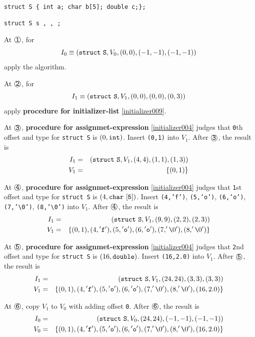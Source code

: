 \begin{Example}

\

{\tt struct S \{ int a; char b[5]; double c;\};}

{\tt struct S s  
,
,
;
}

\noindent
At $\MARU{\tt 1}$, for
\[
I_0 \equiv ({\tt{struct\,\,S}},V_0,(0,0),(-1,-1),(-1,-1)) 
\]
apply the algorithm.

\noindent
At $\MARU{\tt 2}$, for
\[
I_1 \equiv ({\tt{struct\,\,S}},V_1,(0,0),(0,0),(0,3))
\]
apply {\bf procedure for initializer-list} \ref{initializer009}.

\noindent
At $\MARU{\tt 3}$,
{\bf procedure for assignmet-expression} \ref{initializer004} judges
that 
{\tt{0}}th offset and type for {\tt{struct S}} is $(0,{\tt{int}})$.
Insert {\tt (0,1)} into $V_1$. After $\MARU{\tt 3}$, the result is
\begin{eqnarray*}
I_1 & = & ({\tt{struct\,\,S}},V_1,(4,4),(1,1),(1,3)) \\
V_1 & = & \{(0,1)\}
\end{eqnarray*}

\noindent
At $\MARU{\tt 4}$,
{\bf procedure for assignmet-expression} \ref{initializer004} judges
that
{\tt{1}}st offset and type for {\tt{struct S}} is $(4,{\tt{char\,\,[5]}})$.
Insert {\tt{(4,'f')}},
{\tt{(5,'o')}},
{\tt{(6,'o')}},
{\tt{(7,'\verb|\|0')}},
{\tt{(8,'\verb|\|0')}}
into $V_1$.
After $\MARU{\tt 4}$, the result is
\begin{eqnarray*}
I_1 & = & ({\tt{struct\,\,S}},V_1,(9,9),(2,2),(2,3)) \\
V_1 & = & \{(0,1),
 (4,{\tt{'f'}}),(5,{\tt{'o'}}),(6,{\tt{'o'}}),(7,'\verb|\|0'),(8,'\verb|\|0')\}
\end{eqnarray*}

\noindent
At $\MARU{\tt 5}$,
{\bf procedure for assignmet-expression} \ref{initializer004} judges
that
{\tt{2}}nd offset and type for {\tt{struct S}} is $(16,{\tt{double}})$.
Insert {\tt (16,2.0)} into $V_1$.
After $\MARU{\tt 5}$, the result is
\begin{eqnarray*}
I_1 & = & ({\tt{struct\,\,S}},V_1,(24,24),(3,3),(3,3)) \\
V_1 & = & \{(0,1),
 (4,{\tt{'f'}}),(5,{\tt{'o'}}),(6,{\tt{'o'}}),(7,'\verb|\|0'),(8,'\verb|\|0'),
(16,2.0)\}
\end{eqnarray*}

\noindent
At $\MARU{\tt 6}$, copy $V_1$ to $V_0$ with adding offset {\tt 0}.
After $\MARU{\tt 6}$, the result is
\begin{eqnarray*}
I_0 & = & ({\tt{struct\,\,S}},V_0,(24,24),(-1,-1),(-1,-1)) \\
V_0 & = & \{(0,1),
 (4,{\tt{'f'}}),(5,{\tt{'o'}}),(6,{\tt{'o'}}),(7,'\verb|\|0'),(8,'\verb|\|0'),
(16,2.0)\}
\end{eqnarray*}

\end{Example}

